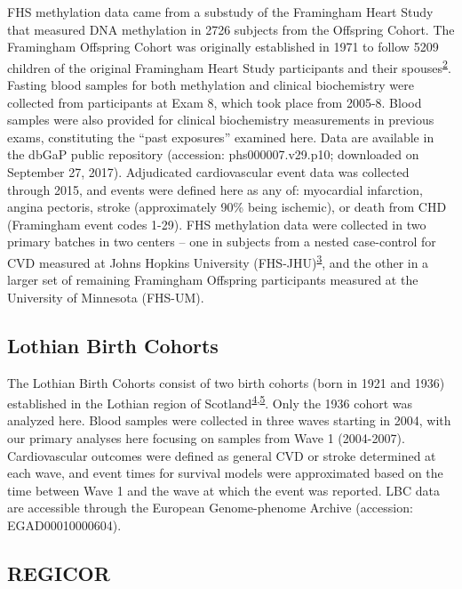 \documentclass[]{article}
\begin{document}
FHS methylation data came from a substudy of the Framingham Heart Study
that measured DNA methylation in 2726 subjects from the Offspring
Cohort. The Framingham Offspring Cohort was originally established in
1971 to follow 5209 children of the original Framingham Heart Study
participants and their
spouses\textsuperscript{\protect\hyperlink{ref-Kannel1979}{2}}. Fasting
blood samples for both methylation and clinical biochemistry were
collected from participants at Exam 8, which took place from 2005-8.
Blood samples were also provided for clinical biochemistry measurements
in previous exams, constituting the ``past exposures'' examined here.
Data are available in the dbGaP public repository (accession:
phs000007.v29.p10; downloaded on September 27, 2017). Adjudicated
cardiovascular event data was collected through 2015, and events were
defined here as any of: myocardial infarction, angina pectoris, stroke
(approximately 90\% being ischemic), or death from CHD (Framingham event
codes 1-29). FHS methylation data were collected in two primary batches
in two centers -- one in subjects from a nested case-control for CVD
measured at Johns Hopkins University
(FHS-JHU)\textsuperscript{\protect\hyperlink{ref-Joehanes2013}{3}}, and
the other in a larger set of remaining Framingham Offspring participants
measured at the University of Minnesota (FHS-UM).

\hypertarget{lothian-birth-cohorts}{%
\subsection{Lothian Birth Cohorts}\label{lothian-birth-cohorts}}

The Lothian Birth Cohorts consist of two birth cohorts (born in 1921 and
1936) established in the Lothian region of
Scotland\textsuperscript{\protect\hyperlink{ref-Deary2012}{4},\protect\hyperlink{ref-Taylor2018}{5}}.
Only the 1936 cohort was analyzed here. Blood samples were collected in
three waves starting in 2004, with our primary analyses here focusing on
samples from Wave 1 (2004-2007). Cardiovascular outcomes were defined as
general CVD or stroke determined at each wave, and event times for
survival models were approximated based on the time between Wave 1 and
the wave at which the event was reported. LBC data are accessible
through the European Genome-phenome Archive (accession:
EGAD00010000604).

\hypertarget{regicor}{%
\subsection{REGICOR}\label{regicor}}
\end{document}
